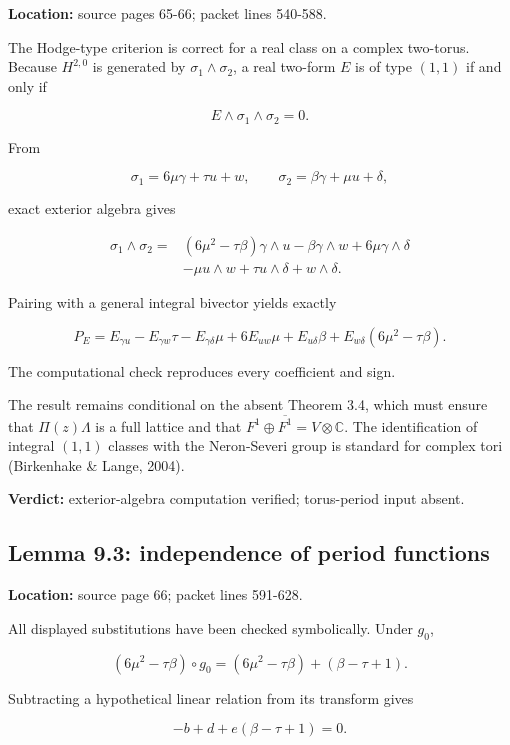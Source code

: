 \documentclass[
  10pt,
]{article}
\begin{document}
\textbf{Location:} source pages 65-66; packet lines 540-588.

The Hodge-type criterion is correct for a real class on a complex
two-torus. Because \(H^{2,0}\) is generated by
\(\sigma_1\wedge\sigma_2\), a real two-form \(E\) is of type \((1,1)\)
if and only if

\[
E\wedge\sigma_1\wedge\sigma_2=0.
\]

From

\[
\sigma_1=6\mu\gamma+\tau u+w,
\qquad
\sigma_2=\beta\gamma+\mu u+\delta,
\]

exact exterior algebra gives

\[
\begin{aligned}
\sigma_1\wedge\sigma_2={}&
(6\mu^2-\tau\beta)\gamma\wedge u
-\beta\gamma\wedge w
+6\mu\gamma\wedge\delta\\
&-\mu u\wedge w
+\tau u\wedge\delta
+w\wedge\delta.
\end{aligned}
\]

Pairing with a general integral bivector yields exactly

\[
P_E=E_{\gamma u}-E_{\gamma w}\tau-E_{\gamma\delta}\mu
+6E_{uw}\mu+E_{u\delta}\beta
+E_{w\delta}(6\mu^2-\tau\beta).
\]

The computational check reproduces every coefficient and sign.

The result remains conditional on the absent Theorem 3.4, which must
ensure that \(\Pi(z)\Lambda\) is a full lattice and that
\(F^1\oplus\overline{F^1}=V\otimes\mathbb C\). The identification of
integral \((1,1)\) classes with the Neron-Severi group is standard for
complex tori (Birkenhake \& Lange, 2004).

\textbf{Verdict:} exterior-algebra computation verified; torus-period
input absent.

\subsection{Lemma 9.3: independence of period
functions}\label{lemma-9.3-independence-of-period-functions}

\textbf{Location:} source page 66; packet lines 591-628.

All displayed substitutions have been checked symbolically. Under
\(g_0\),

\[
(6\mu^2-\tau\beta)\circ g_0
=(6\mu^2-\tau\beta)+(\beta-\tau+1).
\]

Subtracting a hypothetical linear relation from its transform gives

\[
-b+d+e(\beta-\tau+1)=0.
\]
\end{document}
